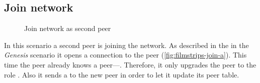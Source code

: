 \subsection{Join network }

\begin{figure}[htb!]
  \centering
	\caption{Join network as second peer}
\label{fig:filmstrips-join}
\end{figure}

In this scenario a second peer is joining the network. As described in the in the \textit{Genesis} scenario it opens a connection to the \signal peer (\vref{fig:filmstrips-join-a}). This time the \signal peer already knows a \router peer—\alice. Therefore, it only upgrades the \newbie peer to the role \peer. Also it sends a \peerUpdate to the new peer in order to let it update its peer table. 

